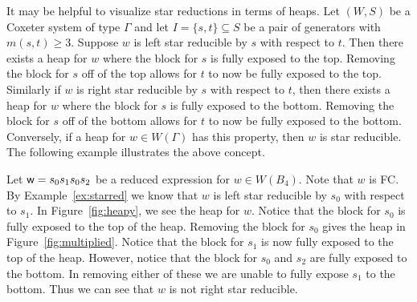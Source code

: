 It may be helpful to visualize star reductions in terms of heaps. Let $(W,S)$ be a Coxeter system of type $\Gamma$ and let $I=\{s,t\}\subseteq S$ be a pair of generators with $m(s,t) \geq 3$. Suppose $w$ is left star reducible by $s$ with respect to $t$. Then there exists a heap for $w$ where the block for $s$ is fully exposed to the top. Removing the block for $s$ off of the top allows for $t$ to now be fully exposed to the top. Similarly if $w$ is right star reducible by $s$ with respect to $t$, then there exists a heap for $w$ where the block for $s$ is fully exposed to the bottom. Removing the block for $s$ off of the bottom allows for $t$ to now be fully exposed to the bottom. Conversely, if a heap for $w \in W(\Gamma)$ has this property, then $w$ is star reducible. The following example illustrates the above concept.

\begin{example}\label{ex:starredheap}
Let $\mathsf{w}=s_0s_1s_0s_2$ be a reduced expression for $w \in W(B_4)$. Note that $w$ is FC. By Example~\ref{ex:starred} we know that $w$ is left star reducible by $s_0$ with respect to $s_1$. In Figure~\ref{fig:heapy}, we see the heap for $w$. Notice that the block for $s_0$ is fully exposed to the top of the heap. Removing the block for $s_0$ gives the heap in Figure~\ref{fig:multiplied}. Notice that the block for $s_1$ is now fully exposed to the top of the heap. However, notice that the block for $s_0$ and $s_2$ are fully exposed to the bottom. In removing either of these we are unable to fully expose $s_1$ to the bottom. Thus we can see that $w$ is not right star reducible.  
\end{example}


